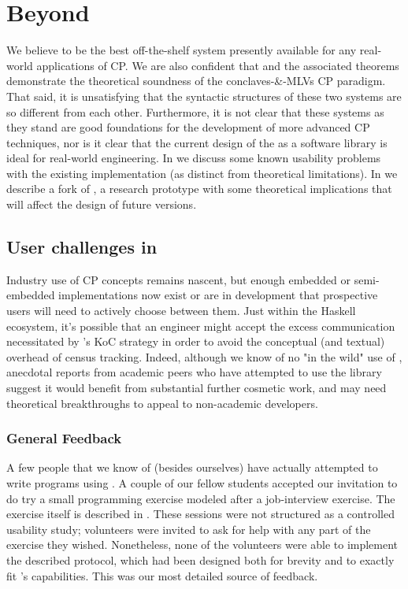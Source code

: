 \chapter{Beyond \MultiChor}
\label{sec:future}

We believe \MultiChor to be the best off-the-shelf system presently available for any real-world applications of CP.
We are also confident that \HLSCentral and the associated theorems demonstrate the theoretical soundness of the conclaves-\&-MLVs
CP paradigm.
That said, it is unsatisfying that the syntactic structures of these two systems are so different from each other.
Furthermore, it is not clear that these systems as they stand are good foundations for the development of more advanced CP techniques,
nor is it clear that the current design of the \MultiChor as a software library is ideal for real-world engineering.
In  we discuss some known usability problems with the existing \MultiChor implementation
(as distinct from theoretical limitations).
In  we describe a fork of \MultiChor, a research prototype with some theoretical implications that will affect
the design of future \MultiChor versions.

\section{User challenges in \MultiChor}
\label{sec:usability}

Industry use of CP concepts remains nascent,
but enough embedded or semi-embedded implementations now exist or are in development that prospective users
will need to actively choose between them.
Just within the Haskell ecosystem, it's possible that an engineer might accept the excess communication necessitated by \HasChor's
KoC strategy in order to avoid the conceptual (and textual) overhead of census tracking.
Indeed, although we know of no "in the wild" use of \MultiChor,
anecdotal reports from academic peers who have attempted to use the library suggest it would benefit from substantial further cosmetic work,
and may need theoretical breakthroughs to appeal to non-academic developers.

\subsection{General Feedback}
\label{sec:usability-sources}
A few people that we know of (besides ourselves) have actually attempted to write programs using \MultiChor.
A couple of our fellow students accepted our invitation to do try a small programming exercise modeled after a job-interview exercise.
The exercise itself is described in .
These sessions were not structured as a controlled usability study;
volunteers were invited to ask for help with any part of the exercise they wished.
Nonetheless, none of the volunteers were able to implement the described protocol,
which had been designed both for brevity and to exactly fit \MultiChor's capabilities.
This was our most detailed source of feedback.

